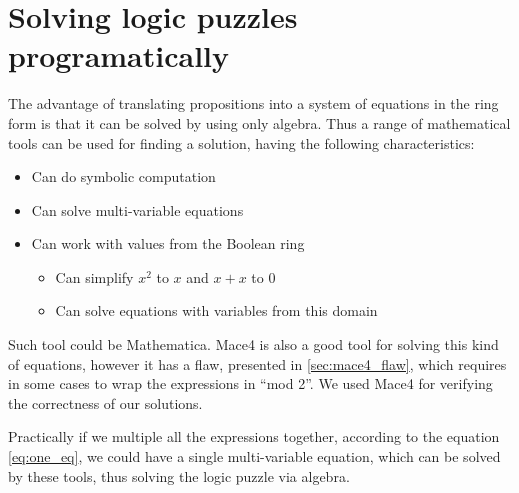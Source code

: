 \section{Solving logic puzzles programatically}
\label{sec:solve}

The advantage of translating propositions into a system of equations in the ring form is that it can be solved by using only algebra. Thus a range of mathematical tools can be used for finding a solution, having the following characteristics:

\begin{itemize}
\item Can do symbolic computation
\item Can solve multi-variable equations
\item Can work with values from the Boolean ring
\begin{itemize}
 \item Can simplify $x^2$ to $x$ and $x + x$ to $0$
 \item Can solve equations with variables from this domain
\end{itemize}

\end{itemize}

Such tool could be Mathematica. Mace4 is also a good tool for solving this kind of equations, however it has a flaw, presented in \ref{sec:mace4_flaw}, which requires in some cases to wrap the expressions in ``mod 2''. We used Mace4 for verifying the correctness of our solutions.

Practically if we multiple all the expressions together, according to the equation \ref{eq:one_eq}, we could have a single multi-variable equation, which can be solved by these tools, thus solving the logic puzzle via algebra.

